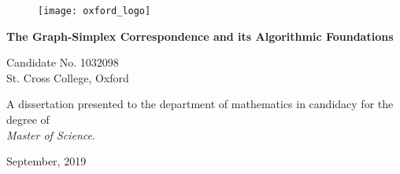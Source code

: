 \begin{titlepage}
	\vspace*{2cm}
	\begin{figure}
		\centering 
		\texttt{[image: oxford\_logo]}
	\end{figure}
	
	\begin{center}
		\begin{adjustwidth}{7em}{7em}
			\centering 
					{\bf \large The Graph-Simplex Correspondence and its Algorithmic Foundations}\\
			\end{adjustwidth}
		\vspace{4cm}
		Candidate No. 1032098\\
		St. Cross College, Oxford
		\vspace{1cm}
		\begin{adjustwidth}{9em}{9em}
			\centering 
					A dissertation presented to  the department of mathematics in candidacy for the degree of \\
					\emph{Master of Science}.
			\end{adjustwidth}
		\vspace{2cm}
		September, 2019
	\end{center}
\end{titlepage}